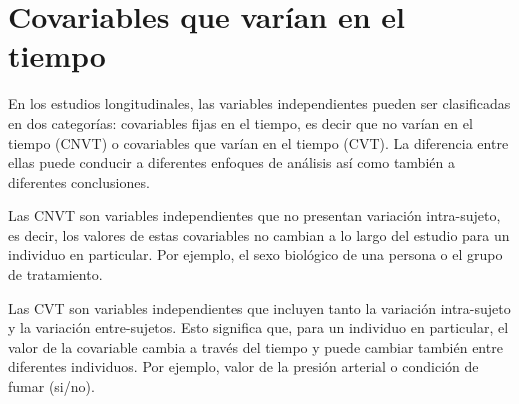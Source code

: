 \documentclass[spanish]{article}
\numberwithin{figure}{subsection}
\numberwithin{equation}{subsection}
\numberwithin{table}{subsection}
\begin{document}





\newpage
\section{Covariables que varían en el tiempo}

En los estudios longitudinales, las variables independientes pueden ser
clasificadas en dos categorías: covariables fijas en el tiempo, es decir que no
varían en el tiempo (CNVT) o covariables que varían en el tiempo (CVT). La
diferencia entre ellas puede conducir a diferentes enfoques de análisis así
como también a diferentes conclusiones.

Las CNVT son variables independientes que no presentan variación intra-sujeto,
es decir, los valores de estas covariables no cambian a lo largo del estudio
para un individuo en particular. Por ejemplo, el sexo biológico de una persona
o el grupo de tratamiento.

Las CVT son variables independientes que incluyen tanto la variación
intra-sujeto y la variación entre-sujetos. Esto significa que, para un
individuo en particular, el valor de la covariable cambia a través del tiempo y
puede cambiar también entre diferentes individuos. Por ejemplo, valor de la
presión arterial o condición de fumar (si/no).
\end{document}
